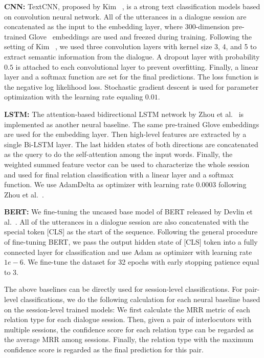 \textbf{CNN:}
TextCNN, proposed by Kim ~, is a strong text classification models 
based on convolution neural network.
All of the utterances in a dialogue session are concatenated as the input to the 
embedding layer, where 300-dimension pre-trained Glove~ 
embeddings are used and freezed 
during training. Following the setting of Kim ~, we used three convolution layers
with kernel size 3, 4, and 5 to extract semantic information from the dialogue. A dropout layer with 
probability $0.5$ is attached to each convolutional layer to prevent overfitting.
Finally, a linear layer and a softmax function are set for the final predictions. 
The loss function is the negative log likelihood loss. Stochastic gradient descent is 
used for parameter optimization with the learning rate equaling $0.01$. 

\textbf{LSTM:}
The attention-based bidirectional LSTM network by Zhou et al.~ 
is implemented as another neural baseline. The same pre-trained Glove embeddings are 
used for the embedding layer. Then high-level features are extracted by a single 
Bi-LSTM layer. The last hidden states of both directions are concatenated as the 
query to do the self-attention among the input words. Finally, the weighted summed 
feature vector can be used to characterize the whole session and used for final relation 
classification with a linear layer and a softmax function. We use AdamDelta as optimizer with
learning rate $0.0003$ following Zhou et al.~.

\textbf{BERT:}
We fine-tuning the uncased base model of BERT released by 
Devlin et al.~. 
All of the utterances in a dialogue session 
are also concatenated with the special token [CLS] as the start of the sequence.
Following the general procedure of fine-tuning BERT, we pass the output hidden state of 
[CLS] token into a fully connected layer for classification and use Adam as optimizer
with learning rate $1e-6$. We fine-tune the dataset for 32 epochs with early stopping
patience equal to 3.

The above baselines can be directly used for session-level classifications. For pair-level classifications, we do the following calculation for each neural baseline based on the session-level trained models: We first calculate the MRR metric of each relation type for each dialogue session. Then, given a pair of interlocutors with multiple sessions, the confidence score for each relation type can be regarded as the average MRR among sessions. Finally, the relation type with the maximum confidence score is regarded as the final prediction for this pair. 




